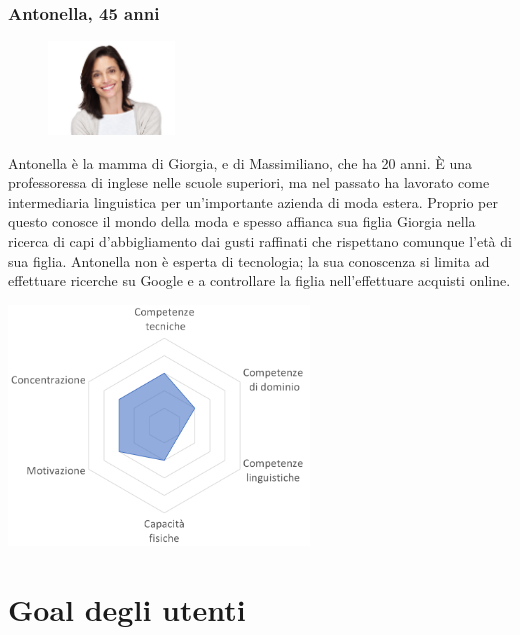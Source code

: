 \documentclass[12pt,a4paper]{report}
\begin{document}
\subsubsection*{Antonella, 45 anni}
\begin{figure}
  \centering
    \includegraphics[width=0.3\textwidth]{"Images Latex/Personas/Antonella"}
\end{figure}
Antonella è la mamma di Giorgia, e di Massimiliano, che ha 20 anni. È una professoressa di inglese nelle scuole superiori, ma nel passato ha lavorato come intermediaria linguistica per un'importante azienda di moda estera. Proprio per questo conosce il mondo della moda e spesso affianca sua figlia Giorgia nella ricerca di capi d'abbigliamento dai gusti raffinati che rispettano comunque l'età di sua figlia. Antonella non è esperta di tecnologia; la sua conoscenza si limita ad effettuare ricerche su Google e a controllare la figlia nell'effettuare acquisti online.
\begin{center}
  \includegraphics[width=0.6\textwidth]{"Images Latex/Personas/Antonella45"}
\end{center}

\section{Goal degli utenti}
\end{document}
